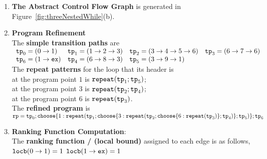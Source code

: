 \begin{enumerate}
  \item  \textbf{The Abstract Control Flow Graph} is generated in Figure~\ref{fig:threeNestedWhile}(b).

  \item \textbf{Program Refinement}
  \\
  The \textbf{simple transition paths} are
  \\
$
      \begin{array}{llll}
          \mathtt{tp}_0 = (0 \to 1)
          &
          \mathtt{tp}_1 = (1 \to 2 \to 3)
          &           
          \mathtt{tp}_2 = (3 \to 4 \to 5 \to 6)
          &
          \mathtt{tp}_3 = (6 \to 7 \to 6)
          \\
          \mathtt{tp}_6 = (1 \to \mathtt{ex})
          &
          \mathtt{tp}_4 = (6 \to 8 \to 3)
          &
          \mathtt{tp}_5 = (3 \to 9 \to 1)
      \end{array}
$
  \\
  The \textbf{repeat patterns}
  for the loop that its header is
  \\
  at the program point 
  $1$ is $\mathtt{repeat}(\mathtt{tp}_1; \mathtt{tp}_5)$; \\
  at the program point $3$ is $\mathtt{repeat}(\mathtt{tp}_2; \mathtt{tp}_4)$;
  \\
  at the program point $6$ is $\mathtt{repeat}(\mathtt{tp}_3)$.
  \\
  The \textbf{refined program
  } is
\\
  $
  \rprog = \tpath_0 ; 
  \rpchoose{1: \rprepeat(\tpath_1; \rpchoose{3: \rprepeat(\tpath_2; \rpchoose{6 : \rprepeat(\tpath_3)}; \tpath_4)}; \tpath_5)}; \tpath_6
$
  \item \textbf{Ranking Function Computation}:
  \\
    The \textbf{ranking function / (local bound)}  assigned to each edge is as follows,
      \\  
      $\mathtt{locb}(0 \to 1) = 1$ 
      \quad $\mathtt{locb}(1 \to \mathtt{ex}) = 1$

\end{enumerate}
